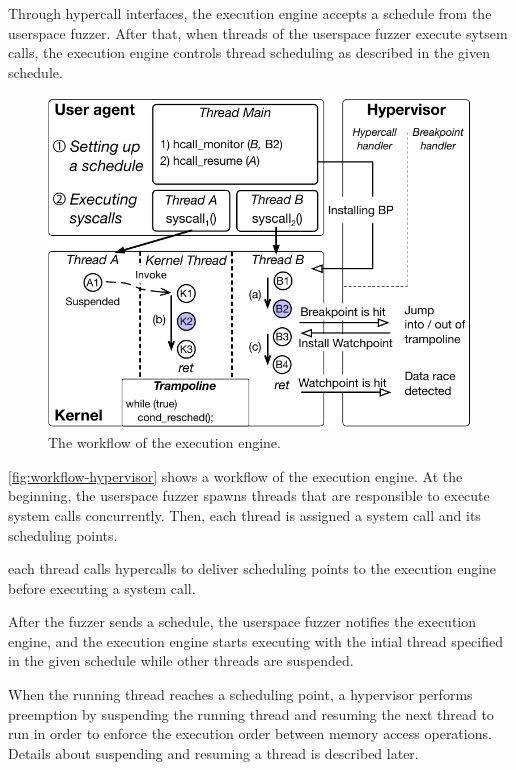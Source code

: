 %
Through hypercall interfaces, the execution engine accepts a schedule
from the userspace fuzzer. After that, when threads of the userspace
fuzzer execute sytsem calls, the execution engine controls thread
scheduling as described in the given schedule.

%
\begin{figure}[t]
  \centering
  \includegraphics[width=0.9\linewidth]{fig/workflow-hypervisor.pdf}
  \caption{The workflow of the execution engine. }
  \label{fig:workflow-hypervisor}
\end{figure}
%
\autoref{fig:workflow-hypervisor} shows a workflow of the execution
engine.
%
At the beginning, the userspace fuzzer spawns threads that are
responsible to execute system calls concurrently.
%
Then, each thread is assigned a system call and its scheduling points.
\dr{}


each thread calls hypercalls to deliver scheduling points to
the execution engine before executing a system call.



After the fuzzer sends a schedule, the userspace fuzzer notifies the
execution engine, and the execution engine starts executing with the
intial thread specified in the given schedule while other threads are
suspended.

%
When the running thread reaches a scheduling point, a hypervisor
performs preemption by suspending the running thread and resuming the
next thread to run in order to enforce the execution order between
memory access operations.
%
Details about suspending and resuming a thread is described later.


